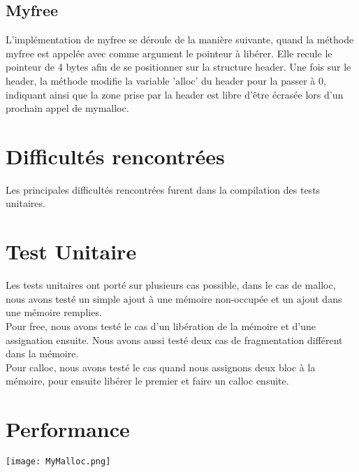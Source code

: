 \documentclass[11pt]{article}
\begin{document}
\subsection{Myfree}
L'implémentation de myfree se déroule de la manière suivante, quand la méthode myfree est appelée avec comme argument le pointeur à libérer. Elle recule le pointeur de 4 bytes afin de se positionner sur la structure header. Une fois sur le header, la méthode modifie la variable 'alloc' du header pour la passer à 0, indiquant ainsi que la zone prise par la header est libre d'être écrasée lors d'un prochain appel de mymalloc.

\section{Difficultés rencontrées}
Les principales difficultés rencontrées furent dans la compilation des tests unitaires.

\section{Test Unitaire}
Les tests unitaires ont porté sur plusieurs cas possible, dans le cas de malloc, nous avons testé un simple ajout à une mémoire non-occupée et un ajout dans une mémoire remplies.\\
Pour free, nous avons testé le cas d'un libération de la mémoire et d'une assignation ensuite. Nous avons aussi testé deux cas de fragmentation différent dans la mémoire.\\
Pour calloc, nous avons testé le cas quand nous assignons deux bloc à la mémoire, pour ensuite libérer le premier et faire un calloc ensuite.

\section{Performance}

\texttt{[image: MyMalloc.png]}
\end{document}
